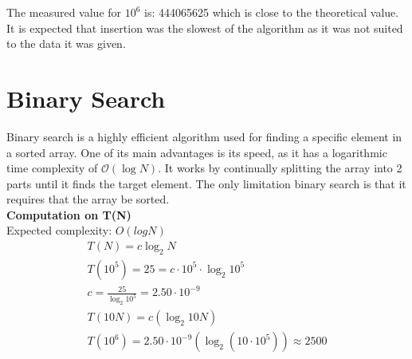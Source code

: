 \documentclass{article}
\begin{document}
The measured value for $10^6$ is: 444065625 which is close to the theoretical value. It is expected that insertion was the slowest of the algorithm as it was not suited to the data it was given. 

\newpage

\newpage
\section{Binary Search}


\begin{center}
\end{center}

Binary search is a highly efficient algorithm used for finding a specific element in a sorted array. One of its main advantages is its speed, as it has a logarithmic time complexity of $\mathcal{O}(\log N)$. It works by continually splitting the array into 2 parts until it finds the target element. The only limitation binary search is that it requires that the array be sorted. \\

\textbf{Computation on T(N)}\\

Expected complexity: $O(logN)$\\

\[
\begin{gathered}
    T(N) = c\log_2 N \\
    T(10^5) = 25 = c \cdot 10^5 \cdot \log_2 10^5 \\
    c = \frac{25}{\log_2 10^5} = 2.50 \cdot 10^{-9} \\
    T(10N) = c(\log_2 10N) \\
    T(10^6) = 2.50 \cdot 10^{-9}(\log_2 (10 \cdot 10^5)) \approx 2500
\end{gathered}
\]
\end{document}
